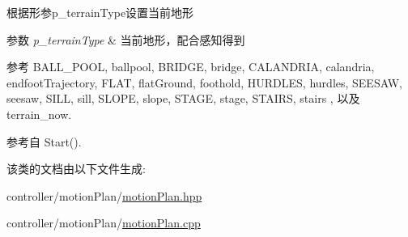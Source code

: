 根据形参p\+\_\+terrain\+Type设置当前地形 


\begin{DoxyParams}{参数}
{\em p\+\_\+terrain\+Type} & 当前地形，配合感知得到 \\
\hline
\end{DoxyParams}


参考 B\+A\+L\+L\+\_\+\+P\+O\+OL, ballpool, B\+R\+I\+D\+GE, bridge, C\+A\+L\+A\+N\+D\+R\+IA, calandria, endfoot\+Trajectory, F\+L\+AT, flat\+Ground, foothold, H\+U\+R\+D\+L\+ES, hurdles, S\+E\+E\+S\+AW, seesaw, S\+I\+LL, sill, S\+L\+O\+PE, slope, S\+T\+A\+GE, stage, S\+T\+A\+I\+RS, stairs , 以及 terrain\+\_\+now.



参考自 Start().



该类的文档由以下文件生成\+:\begin{DoxyCompactItemize}
\item 
controller/motion\+Plan/\hyperlink{motionPlan_8hpp}{motion\+Plan.\+hpp}\item 
controller/motion\+Plan/\hyperlink{motionPlan_8cpp}{motion\+Plan.\+cpp}\end{DoxyCompactItemize}

